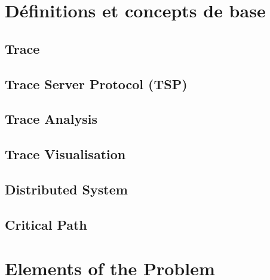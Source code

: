 \label{sec:Introduction}  %


\section{Définitions et concepts de base}  %

\subsection{Trace}

\subsection{Trace Server Protocol (TSP)}

\subsection{Trace Analysis}

\subsection{Trace Visualisation}

\subsection{Distributed System}

\subsection{Critical Path}

\clearpage

\section{Elements of the Problem}  %

